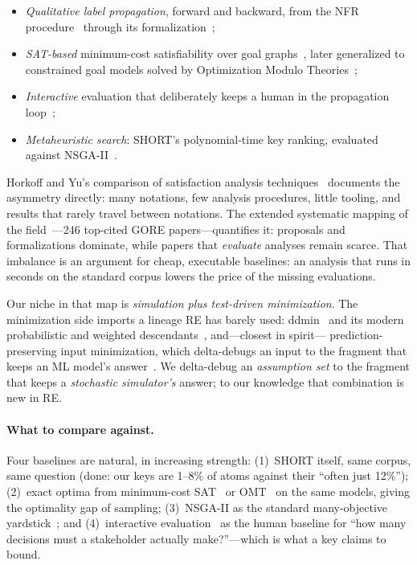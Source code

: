 \documentclass[sigconf,nonacm]{acmart}
\begin{document}
\begin{itemize}
\item \emph{Qualitative label propagation}, forward and
  backward, from the NFR procedure~\cite{chung00} through its
  formalization~\cite{giorgini02};
\item \emph{SAT-based} minimum-cost satisfiability over goal
  graphs~\cite{sebastiani04}, later generalized to
  constrained goal models solved by Optimization Modulo
  Theories~\cite{nguyen16};
\item \emph{Interactive} evaluation that deliberately keeps a
  human in the propagation loop~\cite{horkoff14};
\item \emph{Metaheuristic search}: SHORT's polynomial-time key
  ranking, evaluated against NSGA-II~\cite{mathew17}.
\end{itemize}

Horkoff and Yu's comparison of satisfaction analysis
techniques~\cite{horkoff12} documents the asymmetry directly:
many notations, few analysis procedures, little tooling, and
results that rarely travel between notations. The extended
systematic mapping of the field~\cite{horkoff19}---246
top-cited GORE papers---quantifies it: proposals and
formalizations dominate, while papers that \emph{evaluate}
analyses remain scarce. That imbalance is an argument for
cheap, executable baselines: an analysis that runs in seconds
on the standard corpus lowers the price of the missing
evaluations.

Our niche in that map is \emph{simulation plus test-driven
minimization}. The minimization side imports a lineage RE has
barely used: ddmin~\cite{zeller02} and its modern probabilistic and
weighted descendants~\cite{probdd24,wdd25}, and---closest in
spirit---%
prediction-preserving input minimization, which delta-debugs an
input to the fragment that keeps an ML model's
answer~\cite{suneja20}. We delta-debug an \emph{assumption set}
to the fragment that keeps a \emph{stochastic simulator's}
answer; to our knowledge that combination is new in RE.

\paragraph{What to compare against.} Four baselines are
natural, in increasing strength: (1)~SHORT itself, same corpus,
same question (done: our keys are 1--8\% of atoms against their
``often just 12\%''); (2)~exact optima from minimum-cost
SAT~\cite{sebastiani04} or OMT~\cite{nguyen16} on the same
models, giving the optimality gap of sampling; (3)~NSGA-II as
the standard many-objective yardstick~\cite{mathew17}; and
(4)~interactive evaluation~\cite{horkoff14} as the human
baseline for ``how many decisions must a stakeholder actually
make?''---which is what a key claims to bound.
\end{document}
